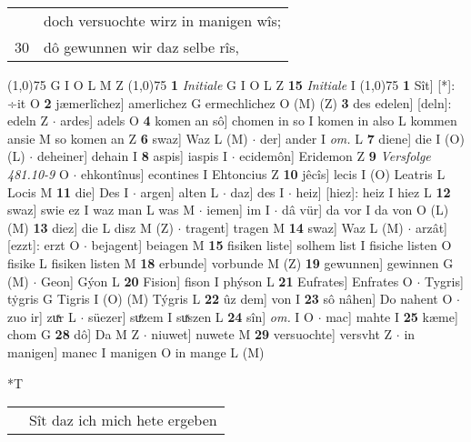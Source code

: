 \documentclass[8pt,a4paper,notitlepage]{article}
\begin{document}
\begin{table}[ht]
\begin{minipage}[t]{0.5\linewidth}
\begin{tabular}{rl}
 & doch versuochte wirz in manigen wîs;\\ 
30 & dô gewunnen wir daz selbe rîs,\\ 
\end{tabular}
\scriptsize
\line(1,0){75} \newline
G I O L M Z \newline
\line(1,0){75} \newline
\textbf{1} \textit{Initiale} G I O L Z  \textbf{15} \textit{Initiale} I  \newline
\line(1,0){75} \newline
\textbf{1} Sît] [*]: ÷it O \textbf{2} jæmerlîchez] amerlichez G ermechlichez O (M) (Z) \textbf{3} des edelen] [deln]: edeln Z  $\cdot$ ardes] adels O \textbf{4} komen an sô] chomen in so I komen in also L kommen ansie M so komen an Z \textbf{6} swaz] Waz L (M)  $\cdot$ der] ander I \textit{om.} L \textbf{7} diene] die I (O) (L)  $\cdot$ deheiner] dehain I \textbf{8} aspis] iaspis I  $\cdot$ ecidemôn] Eridemon Z \textbf{9} \textit{Versfolge 481.10-9} O   $\cdot$ ehkontînus] econtines I Ehtoncius Z \textbf{10} jêcîs] lecis I (O) Leatris L Locis M \textbf{11} die] Des I  $\cdot$ argen] alten L  $\cdot$ daz] des I  $\cdot$ heiz] [hiez]: heiz I hiez L \textbf{12} swaz] swie ez I waz man L was M  $\cdot$ iemen] im I  $\cdot$ dâ vür] da vor I da von O (L) (M) \textbf{13} diez] die L disz M (Z)  $\cdot$ tragent] tragen M \textbf{14} swaz] Waz L (M)  $\cdot$ arzât] [ezzt]: erzt O  $\cdot$ bejagent] beiagen M \textbf{15} fisiken liste] solhem list I fisiche listen O fisike L fisiken listen M \textbf{18} erbunde] vorbunde M (Z) \textbf{19} gewunnen] gewinnen G (M)  $\cdot$ Geon] Gýon L \textbf{20} Fision] fison I phýson L \textbf{21} Eufrates] Enfrates O  $\cdot$ Tygris] tẏgris G Tigris I (O) (M) Týgris L \textbf{22} ûz dem] von I \textbf{23} sô nâhen] Do nahent O  $\cdot$ zuo ir] zuͯr L  $\cdot$ süezer] suͤzem I suͯszen L \textbf{24} sîn] \textit{om.} I O  $\cdot$ mac] mahte I \textbf{25} kæme] chom G \textbf{28} dô] Da M Z  $\cdot$ niuwet] nuwete M \textbf{29} versuochte] versvht Z  $\cdot$ in manigen] manec I manigen O in mange L (M) \newline
\end{minipage}
\hspace{0.5cm}
\begin{minipage}[t]{0.5\linewidth}
\small
\begin{center}*T
\end{center}
\begin{tabular}{rl}
 & Sît daz ich mich hete ergeben\\ 

\end{tabular}
\end{minipage}
\end{table}
\end{document}
